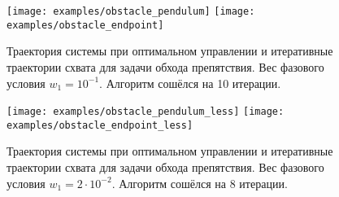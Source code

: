 \documentclass[../../doc.tex]{subfiles}
\begin{document}
    \begin{figure}[ht]
        \begin{center}
            \texttt{[image: examples/obstacle\_pendulum]}
            \texttt{[image: examples/obstacle\_endpoint]}
        \end{center}
        \caption{
            Траектория системы при оптимальном управлении и итеративные траектории схвата для задачи обхода препятствия.
            Вес фазового условия $w_1 = 10^{-1}$.
            Алгоритм сошёлся на 10 итерации.
        }
        \label{fig:obstacle-task}
    \end{figure}
    \begin{figure}[t]
        \begin{center}
            \texttt{[image: examples/obstacle\_pendulum\_less]}
            \texttt{[image: examples/obstacle\_endpoint\_less]}
        \end{center}
        \caption{
            Траектория системы при оптимальном управлении и итеративные траектории схвата для задачи обхода препятствия.
            Вес фазового условия $w_1 = 2 \cdot 10^{-2}$.
            Алгоритм сошёлся на 8 итерации.
        }
        \label{fig:obstacle-less-task}
    \end{figure}

    \ifSubfilesClassLoaded{
        \nocite{*}
        \clearpage
        
        
    }{}
\end{document}
